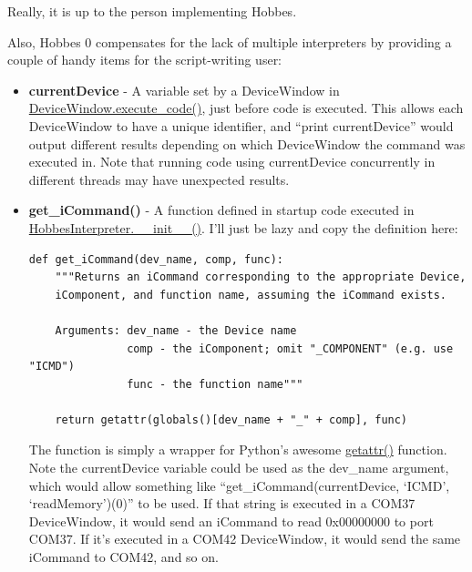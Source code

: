 \documentclass[12pt,letterpaper]{article}
\begin{document}
Really, it is up to the person implementing Hobbes.

Also, Hobbes 0 compensates for the lack of multiple interpreters by providing a couple of handy items for the script-writing user:

\begin{itemize}

\item \textbf{currentDevice} - A variable set by a DeviceWindow in \hyperref[4.3.1.3.17]{DeviceWindow.execute\_code()}, just before code is executed. This allows each DeviceWindow to have a unique identifier, and ``print currentDevice'' would output different results depending on which DeviceWindow the command was executed in. Note that running code using currentDevice concurrently in different threads may have unexpected results.

\item \textbf{get\_iCommand()} - A function defined in startup code executed in \hyperref[4.1.1.0.0]{HobbesInterpreter.\_\_init\_\_()}. I'll just be lazy and copy the definition here:

\selectfont

\begin{lstlisting}
def get_iCommand(dev_name, comp, func):
    """Returns an iCommand corresponding to the appropriate Device,
    iComponent, and function name, assuming the iCommand exists.
    
    Arguments: dev_name - the Device name
               comp - the iComponent; omit "_COMPONENT" (e.g. use "ICMD")
               func - the function name"""
    
    return getattr(globals()[dev_name + "_" + comp], func)
\end{lstlisting}

\selectfont

The function is simply a wrapper for Python's awesome \href{http://docs.python.org/library/functions.html#getattr}{getattr()} function. Note the currentDevice variable could be used as the dev\_name argument, which would allow something like ``get\_iCommand(currentDevice, `ICMD', `readMemory')(0)'' to be used. If that string is executed in a COM37 DeviceWindow, it would send an iCommand to read 0x00000000 to port COM37. If it's executed in a COM42 DeviceWindow, it would send the same iCommand to COM42, and so on.

\end{itemize}
\end{document}
